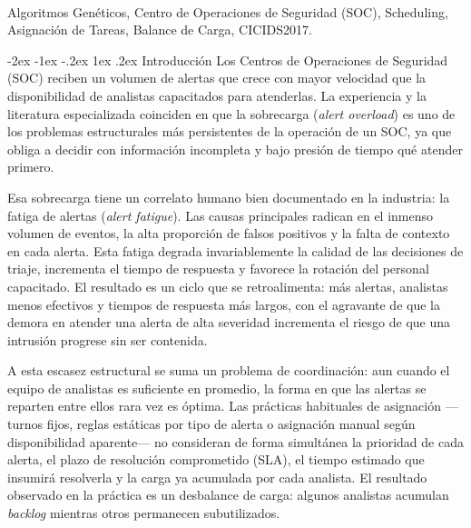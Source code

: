 \documentclass[12pt,a4paper,twocolumn]{article}
\makeatletter
\renewcommand{\section}{\@startsection{section}{1}{\z@}%
  {-2ex \@plus -1ex \@minus -.2ex}%
  {1ex \@plus.2ex}%
  {\fontsize{12}{14}\selectfont\bfseries}}
\makeatother
\begin{document}
 \\
{\fontsize{10}{12}\selectfont
Algoritmos Genéticos, Centro de Operaciones de Seguridad (SOC), Scheduling, Asignación de Tareas, Balance de Carga, CICIDS2017.\par}
\vspace{1em}

\section{Introducción}
Los Centros de Operaciones de Seguridad (SOC) reciben un volumen de alertas que crece con mayor velocidad que la disponibilidad de analistas capacitados para atenderlas. La experiencia y la literatura especializada coinciden en que la sobrecarga (\textit{alert overload}) es uno de los problemas estructurales más persistentes de la operación de un SOC, ya que obliga a decidir con información incompleta y bajo presión de tiempo qué atender primero.

Esa sobrecarga tiene un correlato humano bien documentado en la industria: la fatiga de alertas (\textit{alert fatigue}). Las causas principales radican en el inmenso volumen de eventos, la alta proporción de falsos positivos y la falta de contexto en cada alerta. Esta fatiga degrada invariablemente la calidad de las decisiones de triaje, incrementa el tiempo de respuesta y favorece la rotación del personal capacitado. El resultado es un ciclo que se retroalimenta: más alertas, analistas menos efectivos y tiempos de respuesta más largos, con el agravante de que la demora en atender una alerta de alta severidad incrementa el riesgo de que una intrusión progrese sin ser contenida.

A esta escasez estructural se suma un problema de coordinación: aun cuando el equipo de analistas es suficiente en promedio, la forma en que las alertas se reparten entre ellos rara vez es óptima. Las prácticas habituales de asignación ---turnos fijos, reglas estáticas por tipo de alerta o asignación manual según disponibilidad aparente--- no consideran de forma simultánea la prioridad de cada alerta, el plazo de resolución comprometido (SLA), el tiempo estimado que insumirá resolverla y la carga ya acumulada por cada analista. El resultado observado en la práctica es un desbalance de carga: algunos analistas acumulan \textit{backlog} mientras otros permanecen subutilizados.
\end{document}
